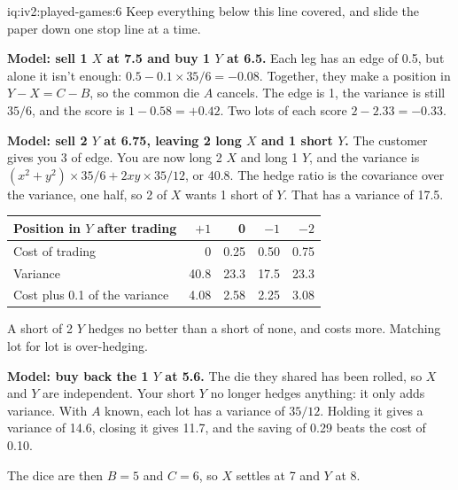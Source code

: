 \begin{solution}{iq:iv2:played-games:6}
Keep everything below this line covered, and slide the paper down one stop line at a time.

\ivstop
\textbf{Model: sell 1 $X$ at 7.5 and buy 1 $Y$ at 6.5.} Each leg has an edge of 0.5, but alone it isn't enough: $0.5 - 0.1 \times 35/6 = -0.08$. Together, they make a position in $Y - X = C - B$, so the common die $A$ cancels. The edge is 1, the variance is still $35/6$, and the score is $1 - 0.58 = +0.42$. Two lots of each score $2 - 2.33 = -0.33$.

\ivstop
\textbf{Model: sell 2 $Y$ at 6.75, leaving 2 long $X$ and 1 short $Y$.} The customer gives you 3 of edge. You are now long 2 $X$ and long 1 $Y$, and the variance is $(x^2 + y^2) \times 35/6 + 2xy \times 35/12$, or 40.8. The hedge ratio is the covariance over the variance, one half, so 2 of $X$ wants 1 short of $Y$. That has a variance of 17.5.
\begin{center}\small
\begin{tabular}{@{}l*{4}{r}@{}}
Position in $Y$ after trading & $+1$ & 0 & $-1$ & $-2$ \\ \hline
Cost of trading & 0 & 0.25 & 0.50 & 0.75 \\
Variance & 40.8 & 23.3 & 17.5 & 23.3 \\
Cost plus 0.1 of the variance & 4.08 & 2.58 & 2.25 & 3.08
\end{tabular}
\end{center}
A short of 2 $Y$ hedges no better than a short of none, and costs more. Matching lot for lot is over-hedging.

\ivstop
\textbf{Model: buy back the 1 $Y$ at 5.6.} The die they shared has been rolled, so $X$ and $Y$ are independent. Your short $Y$ no longer hedges anything: it only adds variance. With $A$ known, each lot has a variance of $35/12$. Holding it gives a variance of 14.6, closing it gives 11.7, and the saving of 0.29 beats the cost of 0.10.

The dice are then $B = 5$ and $C = 6$, so $X$ settles at 7 and $Y$ at 8.


\end{solution}
